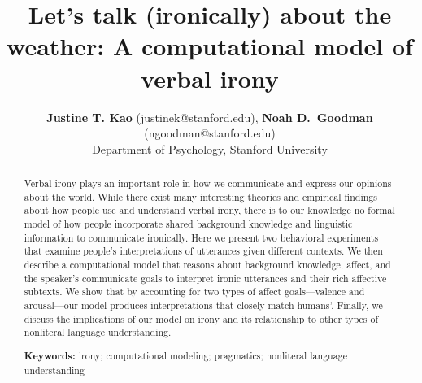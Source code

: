 \documentclass[10pt,letterpaper]{article}
\title{Let's talk (ironically) about the weather: A computational model of verbal irony}
\author{{\large {\bf Justine T. Kao} (justinek@stanford.edu)}, {\large {\bf Noah D.~Goodman} (ngoodman@stanford.edu)}\\
  Department of Psychology, Stanford University}
\begin{document}
\maketitle


\begin{abstract}
Verbal irony plays an important role in how we communicate and express our opinions about the world. While there exist many interesting theories and empirical findings about how people use and understand verbal irony, there is to our knowledge no formal model of how people incorporate shared background knowledge and linguistic information to communicate ironically. Here we present two behavioral experiments that examine people's interpretations of utterances given different contexts. We then describe a computational model that reasons about background knowledge, affect, and the speaker's communicate goals to interpret ironic utterances and their rich affective subtexts. We show that by accounting for two types of affect goals---valence and arousal---our model produces interpretations that closely match humans'. Finally, we discuss the implications of our model on irony and its relationship to other types of nonliteral language understanding.


\textbf{Keywords:} 
irony; computational modeling; pragmatics; nonliteral language understanding
\end{abstract}
\end{document}
